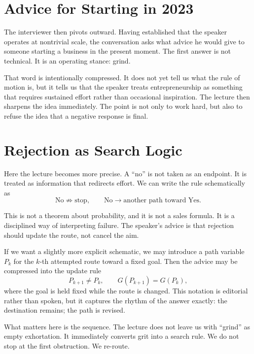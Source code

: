 \section{Advice for Starting in 2023}

The interviewer then pivots outward. Having established that the speaker operates at nontrivial scale, the conversation asks what advice he would give to someone starting a business in the present moment. The first answer is not technical. It is an operating stance: grind.

That word is intentionally compressed. It does not yet tell us what the rule of motion is, but it tells us that the speaker treats entrepreneurship as something that requires sustained effort rather than occasional inspiration. The lecture then sharpens the idea immediately. The point is not only to work hard, but also to refuse the idea that a negative response is final.

\section{Rejection as Search Logic}

Here the lecture becomes more precise. A ``no'' is not taken as an endpoint. It is treated as information that redirects effort. We can write the rule schematically as
\begin{equation}
\text{No} \not\Rightarrow \text{stop},
\qquad
\text{No} \to \text{another path toward Yes}.
\end{equation}

This is not a theorem about probability, and it is not a sales formula. It is a disciplined way of interpreting failure. The speaker's advice is that rejection should update the route, not cancel the aim.

If we want a slightly more explicit schematic, we may introduce a path variable \(P_k\) for the \(k\)-th attempted route toward a fixed goal. Then the advice may be compressed into the update rule
\begin{equation}
P_{k+1} \neq P_k,
\qquad
G(P_{k+1}) = G(P_k),
\end{equation}
where the goal is held fixed while the route is changed. This notation is editorial rather than spoken, but it captures the rhythm of the answer exactly: the destination remains; the path is revised.

What matters here is the sequence. The lecture does not leave us with ``grind'' as empty exhortation. It immediately converts grit into a search rule. We do not stop at the first obstruction. We re-route.

